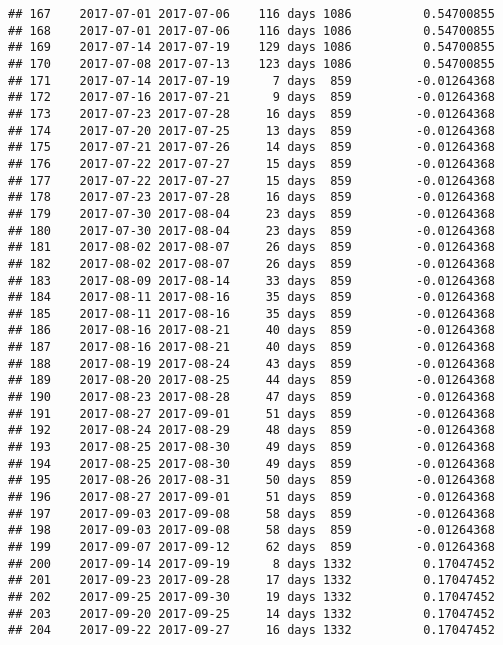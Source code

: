 \documentclass[]{article}
\begin{document}
\begin{verbatim}
## 167    2017-07-01 2017-07-06    116 days 1086          0.54700855
## 168    2017-07-01 2017-07-06    116 days 1086          0.54700855
## 169    2017-07-14 2017-07-19    129 days 1086          0.54700855
## 170    2017-07-08 2017-07-13    123 days 1086          0.54700855
## 171    2017-07-14 2017-07-19      7 days  859         -0.01264368
## 172    2017-07-16 2017-07-21      9 days  859         -0.01264368
## 173    2017-07-23 2017-07-28     16 days  859         -0.01264368
## 174    2017-07-20 2017-07-25     13 days  859         -0.01264368
## 175    2017-07-21 2017-07-26     14 days  859         -0.01264368
## 176    2017-07-22 2017-07-27     15 days  859         -0.01264368
## 177    2017-07-22 2017-07-27     15 days  859         -0.01264368
## 178    2017-07-23 2017-07-28     16 days  859         -0.01264368
## 179    2017-07-30 2017-08-04     23 days  859         -0.01264368
## 180    2017-07-30 2017-08-04     23 days  859         -0.01264368
## 181    2017-08-02 2017-08-07     26 days  859         -0.01264368
## 182    2017-08-02 2017-08-07     26 days  859         -0.01264368
## 183    2017-08-09 2017-08-14     33 days  859         -0.01264368
## 184    2017-08-11 2017-08-16     35 days  859         -0.01264368
## 185    2017-08-11 2017-08-16     35 days  859         -0.01264368
## 186    2017-08-16 2017-08-21     40 days  859         -0.01264368
## 187    2017-08-16 2017-08-21     40 days  859         -0.01264368
## 188    2017-08-19 2017-08-24     43 days  859         -0.01264368
## 189    2017-08-20 2017-08-25     44 days  859         -0.01264368
## 190    2017-08-23 2017-08-28     47 days  859         -0.01264368
## 191    2017-08-27 2017-09-01     51 days  859         -0.01264368
## 192    2017-08-24 2017-08-29     48 days  859         -0.01264368
## 193    2017-08-25 2017-08-30     49 days  859         -0.01264368
## 194    2017-08-25 2017-08-30     49 days  859         -0.01264368
## 195    2017-08-26 2017-08-31     50 days  859         -0.01264368
## 196    2017-08-27 2017-09-01     51 days  859         -0.01264368
## 197    2017-09-03 2017-09-08     58 days  859         -0.01264368
## 198    2017-09-03 2017-09-08     58 days  859         -0.01264368
## 199    2017-09-07 2017-09-12     62 days  859         -0.01264368
## 200    2017-09-14 2017-09-19      8 days 1332          0.17047452
## 201    2017-09-23 2017-09-28     17 days 1332          0.17047452
## 202    2017-09-25 2017-09-30     19 days 1332          0.17047452
## 203    2017-09-20 2017-09-25     14 days 1332          0.17047452
## 204    2017-09-22 2017-09-27     16 days 1332          0.17047452

\end{verbatim}
\end{document}
